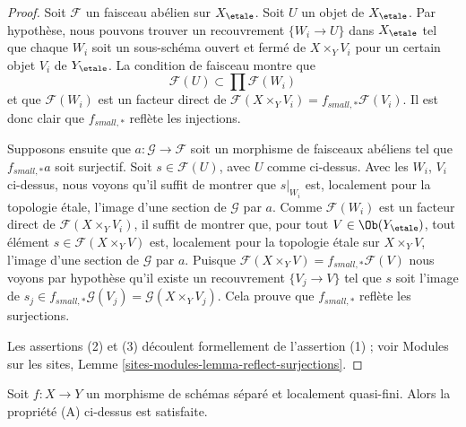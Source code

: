 \begin{proof}
Soit $\mathcal{F}$ un faisceau ab\'elien sur $X_\etale$.
Soit $U$ un objet de $X_\etale$. Par hypoth\`ese, nous pouvons trouver un
recouvrement $\{W_i \to U\}$ dans $X_\etale$ tel que chaque $W_i$ soit
un sous-sch\'ema ouvert et ferm\'e de $X \times_Y V_i$ pour un certain objet
$V_i$ de $Y_\etale$. La condition de faisceau montre que
$$
\mathcal{F}(U) \subset \prod \mathcal{F}(W_i)
$$
et que $\mathcal{F}(W_i)$ est un facteur direct de
$\mathcal{F}(X \times_Y V_i) = f_{small, *}\mathcal{F}(V_i)$.
Il est donc clair que $f_{small, *}$ refl\`ete les injections.

\medskip\noindent
Supposons ensuite que $a : \mathcal{G} \to \mathcal{F}$ soit un morphisme de
faisceaux ab\'eliens tel que $f_{small, *}a$ soit surjectif. Soit
$s \in \mathcal{F}(U)$, avec $U$ comme ci-dessus. Avec les $W_i$, $V_i$ ci-dessus,
nous voyons qu'il suffit de montrer que $s|_{W_i}$ est, localement pour la topologie \'etale,
l'image d'une section de $\mathcal{G}$ par $a$. Comme $\mathcal{F}(W_i)$
est un facteur direct de $\mathcal{F}(X \times_Y V_i)$,
il suffit de montrer que, pour tout $V \in \Ob(Y_\etale)$,
tout \'el\'ement $s \in \mathcal{F}(X \times_Y V)$
est, localement pour la topologie \'etale sur $X \times_Y V$, l'image d'une section de
$\mathcal{G}$ par $a$. Puisque
$\mathcal{F}(X \times_Y V) = f_{small, *}\mathcal{F}(V)$
nous voyons par hypoth\`ese qu'il existe un recouvrement $\{V_j \to V\}$ tel que
$s$ soit l'image de
$s_j \in f_{small, *}\mathcal{G}(V_j) = \mathcal{G}(X \times_Y V_j)$.
Cela prouve que $f_{small, *}$ refl\`ete les surjections.

\medskip\noindent
Les assertions (2) et (3) d\'ecoulent formellement de l'assertion (1) ; voir
Modules sur les sites, Lemme \ref{sites-modules-lemma-reflect-surjections}.
\end{proof}

\begin{lemma}
\label{lemma-locally-quasi-finite-A}
Soit $f : X \to Y$ un morphisme de sch\'emas s\'epar\'e et localement quasi-fini.
Alors la propri\'et\'e (A) ci-dessus est satisfaite.
\end{lemma}

